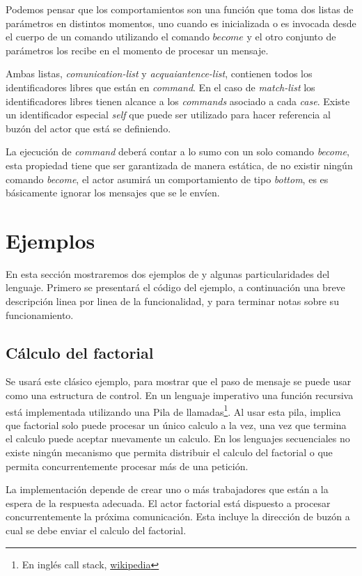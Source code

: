 Podemos pensar que los comportamientos son una función que toma dos listas de parámetros en distintos momentos, uno cuando es inicializada o es invocada desde el cuerpo de un comando utilizando el comando $become$ y el otro conjunto de parámetros los recibe en el momento de procesar un mensaje.

Ambas listas, \textit{comunication-list} y \textit{acquaiantence-list}, contienen todos los identificadores libres que están en \textit{command}. En el caso de \textit{match-list} los identificadores libres tienen alcance a los \textit{commands} asociado a cada \textit{case}. Existe un identificador especial \textit{self} que puede ser utilizado para hacer referencia al buzón del actor que está se definiendo. 

La ejecución de \textit{command} deberá contar a lo sumo con un solo comando \textit{become}, esta propiedad tiene que ser garantizada de manera estática, de no existir ningún comando \textit{become}, el actor asumirá un comportamiento de tipo \textit{bottom}, es es básicamente ignorar los mensajes que se le envíen.

\section{Ejemplos}

En esta sección mostraremos dos ejemplos de \SAL y algunas particularidades del lenguaje. Primero se presentará el código del ejemplo, a continuación una breve descripción linea por linea de la funcionalidad, y para terminar notas sobre su funcionamiento.

\subsection{Cálculo del factorial}\label{sal:factorial}

Se usará este clásico ejemplo, para mostrar que el paso de mensaje se puede usar como una estructura de control. En un lenguaje imperativo una función recursiva está implementada utilizando una Pila de llamadas\footnote{En inglés call stack, \href{https://es.wikipedia.org/wiki/Pila_de_llamadas}{wikipedia}}. Al usar esta pila, implica que factorial solo puede procesar un único calculo a la vez, una vez que termina el calculo puede aceptar nuevamente un calculo. En los lenguajes secuenciales no existe ningún mecanismo que permita distribuir el calculo del factorial o que permita concurrentemente procesar más de una petición.

La implementación depende de crear uno o más trabajadores que están a la espera de la respuesta adecuada. El actor factorial está dispuesto a procesar concurrentemente la próxima comunicación. Esta incluye la dirección de buzón a cual se debe enviar el calculo del factorial.

